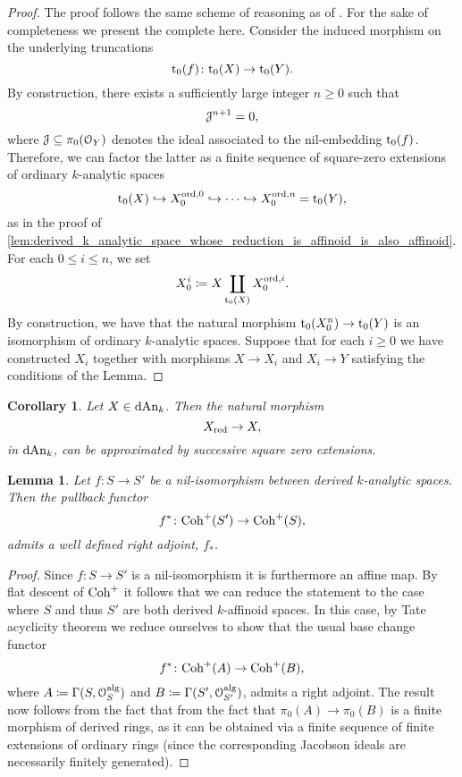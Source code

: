 \documentclass[10pt,a4paper,reqno]{amsart} %
\theoremstyle{plain}
\newtheorem{lem}[thm]{Lemma}
\newtheorem{cor}[thm]{Corollary}
\theoremstyle{definition}
\theoremstyle{remark}
\numberwithin{equation}{section}
\begin{document}
\begin{proof}
    The proof follows the same scheme of reasoning as of \cite[Proposition 5.5.3]{Gaitsgory_Study_II}. For the sake of completeness we present the complete here.
    Consider the induced morphism on the underlying truncations
        \[
            \mathrm{t}_0(f) \colon \mathrm{t}_0(X) \to \mathrm{t}_0(Y).   
        \]
    By construction, there exists a sufficiently large integer $n \ge 0$ such that
        \[
            \mathcal J^{n+1} = 0,  
        \]
    where $\mathcal J \subseteq \pi_0(\mathcal O_Y)$ denotes the ideal associated to the nil-embedding $\mathrm{t}_0(f)$.
    Therefore, we can factor the latter as a finite sequence of square-zero extensions of ordinary $k$-analytic spaces
        \[
            \mathrm{t}_0(X) \hookrightarrow X_0^{\mathrm{ord}, 0} \hookrightarrow \dots \hookrightarrow X^{\mathrm{ord}, n}_0 = \mathrm{t}_0(Y),
        \]
    as in the proof of \cref{lem:derived_k_analytic_space_whose_reduction_is_affinoid_is_also_affinoid}. For each $0 \le i \le n$, we set
        \[
            X_0^i \coloneqq X \coprod_{\mathrm{t}_0(X)} X_0^{\mathrm{ord}, i}.
        \]
    By construction, we have that the natural morphism $\mathrm{t}_0(X_0^n) \to \mathrm{t}_0(Y)$ is an isomorphism of ordinary $k$-analytic spaces.
    Suppose that for each $i \ge 0$ we have constructed $X_i$ together with morphisms $X \to X_i$ and $X_i \to Y$ satisfying the conditions of the Lemma.
    
\end{proof}

\begin{cor}
    Let $X \in \mathrm{dAn}_k$. Then the natural morphism
        \[
            X_{\mathrm{red}} \to X,  
        \]
    in $\mathrm{dAn}_k$, can be \emph{approximated} by successive square zero extensions.
\end{cor}


\begin{lem}
    Let $f \colon S \to S'$ be a nil-isomorphism between derived $k$-analytic spaces. Then the pullback functor
        \[
            f^* \colon \mathrm{Coh}^+(S') \to \mathrm{Coh}^+(S),  
        \]
    admits a well defined right adjoint, $f_*$.
\end{lem}

\begin{proof} 
    Since $f \colon S \to S'$ is a nil-isomorphism it is furthermore an affine map. By flat descent of $\mathrm{Coh}^+$ it follows that
    we can reduce the statement to the case where $S$ and thus $S'$ are both derived $k$-affinoid spaces. In this case, by Tate acyclicity theorem we reduce ourselves
    to show that the usual base change functor
        \[
           f^* \colon  \mathrm{Coh}^+(A) \to \mathrm{Coh}^+(B)  ,
        \]
    where $A \coloneqq \Gamma(S, \mathcal O_S ^\mathrm{alg})$ and $B \coloneqq \Gamma(S', \mathcal O_{S'} ^\mathrm{alg})$, admits a right adjoint. The result now follows from the fact that
    from the fact that $\pi_0(A) \to \pi_0(B)$ is a finite morphism of derived rings, as it can be obtained via a finite sequence of finite extensions
    of ordinary rings (since the corresponding Jacobson ideals are necessarily finitely generated). 
\end{proof}
\end{document}
